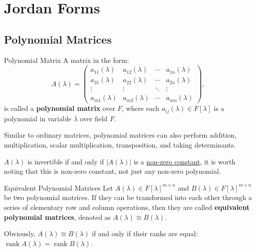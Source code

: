 \documentclass[11pt]{../../TexTemplate/elegantbook} %
\begin{document}
\chapter{Jordan Forms}
\section{Polynomial Matrices}
\begin{definition}{Polynomial Matrix}
    A matrix in the form:
    \[
    A(\lambda) = 
    \begin{pmatrix}
        a_{11}(\lambda) & a_{12}(\lambda) & \cdots & a_{1n}(\lambda) \\
        a_{21}(\lambda) & a_{22}(\lambda) & \cdots & a_{2n}(\lambda) \\
        \vdots & \vdots & \ddots & \vdots \\
        a_{m1}(\lambda) & a_{m2}(\lambda) & \cdots & a_{mn}(\lambda)
    \end{pmatrix},
    \]
    is called a \textbf{polynomial matrix} over \( F \),
    where each \( a_{ij}(\lambda) \in F[\lambda] \) is a polynomial in variable \( \lambda \) over field \( F \).
\end{definition}
Similar to ordinary matrices,
polynomial matrices can also perform addition, multiplication, scalar multiplication, transposition, and taking determinants.
\begin{caution}
    \(A (\lambda)\) is invertible if and only if \( |A(\lambda)| \) is a \underline{non-zero constant},
    it is worth noting that this is non-zero constant, not just any non-zero polynomial.
\end{caution}

\begin{definition}{Equivalent Polynomial Matrices}
    Let \( A(\lambda) \in F[\lambda]^{m \times n} \) and \( B(\lambda) \in F[\lambda]^{m \times n} \) be two polynomial matrices.
    If they can be transformed into each other through a series of elementary row and column operations,
    then they are called \textbf{equivalent polynomial matrices}, denoted as \( A(\lambda) \cong B(\lambda) \).
\end{definition}
\begin{note}
    Obviously, \( A(\lambda) \cong B(\lambda) \) if and only if 
    their ranks are equal: \( \operatorname{rank} A(\lambda) = \operatorname{rank} B(\lambda) \).
\end{note}
\end{document}

